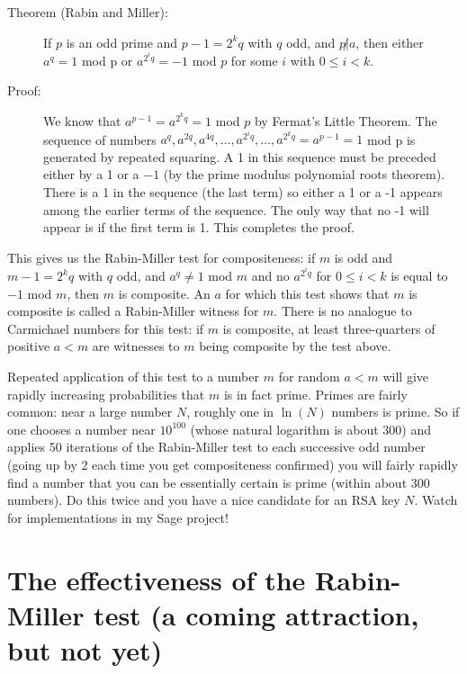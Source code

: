 \documentclass[12pt]{article}
\begin{document}
\begin{description}

\item[Theorem (Rabin and Miller):]  If $p$ is an odd prime and $p-1=2^kq$ with $q$ odd,  and $p \not|a$,
then either $a^q=1$ mod p or $a^{2^iq}=-1$ mod $p$ for some $i$ with $0 \leq i<k$.

\item[Proof:]   We know that $a^{p-1}=a^{2^kq}=1$ mod $p$ by Fermat's Little Theorem.   The sequence of numbers $a^q, a^{2q}, a^{4q},\ldots,a^{2^iq},\ldots,a^{2^kq}=a^{p-1}=1$ mod p is generated by repeated squaring.
A 1 in this sequence must be preceded either by a 1 or a $-1$ (by the prime modulus polynomial roots theorem).   There is a 1 in the sequence (the last term) so either a 1 or a -1 appears among the earlier terms of the  sequence.  The only way that no -1 will appear is if the first term is 1.   This completes the proof.
  

\end{description}

This gives us the Rabin-Miller test for compositeness:  if $m$  is odd and $m-1=2^kq$ with $q$ odd, and $a^q \neq 1$ mod $m$ and no $a^{2^iq}$ for $0\leq i<k$ is equal to $-1$ mod $m$, then $m$ is composite.  An $a$ for which this test shows that $m$ is composite is called a Rabin-Miller witness for $m$.  There is no analogue to Carmichael numbers
for this test:  if  $m$ is composite, at least three-quarters of positive $a<m$ are witnesses to $m$ being composite by the test above.

Repeated application of this test to a number $m$  for random $a<m$ will give rapidly increasing probabilities that $m$ is in fact prime.   Primes are fairly common:  near a large number $N$, roughly one in $\ln(N)$ numbers is prime.
So if one chooses a number near $10^{100}$ (whose natural logarithm is about 300) and applies 50 iterations of the Rabin-Miller test to each successive odd number (going up by 2 each time you get compositeness confirmed) you will
fairly rapidly find a number that you can be essentially certain is prime (within about 300 numbers).   Do this twice and you have a nice candidate for an RSA key $N$.  Watch for implementations in my Sage project!


\section{The effectiveness of the Rabin-Miller test (a coming attraction, but not yet)}
\end{document}
